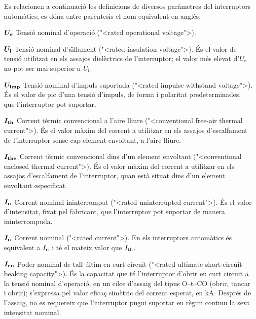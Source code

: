 Es relacionen a continuaci\'{o} les definicions de diversos par\`{a}metres del interruptors autom\`{a}tics; es d\'{o}na entre par\`{e}ntesis el nom equivalent en angl\`{e}s:
\begin{list}{}
   {\setlength{\labelwidth}{10mm} \setlength{\leftmargin}{10mm} \setlength{\labelsep}{2mm}}
   \item[$\boldsymbol{U_\mathrm{e}}$] Tensi\'{o} nominal d'operaci\'{o} ({"<}rated operational voltage{">}).
   \item[$\boldsymbol{U_\mathrm{i}}$] Tensi\'{o} nominal d'a\"{\i}llament ({"<}rated insulation voltage{">}). \'{E}s el valor de tensi\'{o} utilitzat en els assajos diel\`{e}ctrics de l'interruptor;  el valor m\'{e}s elevat d'$U_\mathrm{e}$ no pot ser mai superior a $U_\mathrm{i}$.
    \item[$\boldsymbol{U_\mathrm{imp}}$] Tensi\'{o} nominal d'impuls suportada ({"<}rated impulse withstand voltage{">}). \'{E}s el valor de pic d'una tensi\'{o} d'impuls, de forma i polaritat predeterminades, que l'interruptor pot suportar.
   \item[$\boldsymbol{I_\mathrm{th}}$] Corrent t\`{e}rmic convencional a l'aire lliure ({"<}conventional free-air thermal current{">}).  \'{E}s el valor  m\`{a}xim del corrent a utilitzar en els assajos d'escalfament de l'interruptor sense cap element envoltant, a l'aire lliure.
   \item[$\boldsymbol{I_\mathrm{the}}$] Corrent t\`{e}rmic convencional dins d'un element envoltant ({"<}conventional enclosed thermal current{">}).  \'{E}s el valor  m\`{a}xim del corrent a utilitzar en els assajos d'escalfament de l'interruptor, quan est\`{a} situat dins d'un element envoltant especificat.
    \item[$\boldsymbol{I_\mathrm{u}}$] Corrent nominal ininterromput ({"<}rated uninterrupted current{">}).  \'{E}s el valor d'intensitat, fixat pel fabricant, que l'interruptor pot suportar de manera ininterrompuda.
    \item[$\boldsymbol{I_\mathrm{n}}$] Corrent nominal ({"<}rated current{">}).  En els interruptors autom\`{a}tics \'{e}s equivalent a $I_\mathrm{u}$ i t\'{e} el mateix valor que $I_\mathrm{th}$.
    \item[$\boldsymbol{I_\mathrm{cu}}$] Poder nominal de tall \'{u}ltim en curt circuit ({"<}rated ultimate  short-circuit beaking capacity{">}). \'{E}s la capacitat que t\'{e} l'interruptor d'obrir en curt circuit a la tensi\'{o} nominal d'operaci\'{o}, en un cilce d'assaig del tipus O--t--CO (obrir, tancar i obrir); s'expressa pel valor efica\c{c} sim\`{e}tric del corrent esperat, en kA. Despr\'{e}s de l'assaig, no es requereix que l'interruptor pugui suportar en r\`{e}gim continu la seva intensitat nominal.

\end{list}
